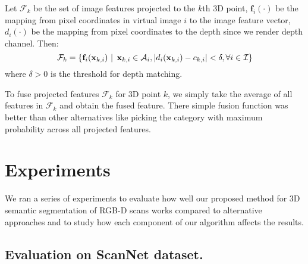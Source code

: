\documentclass[runningheads]{llncs}
\begin{document}
Let $\mathcal{F}_k$ be the set of image features projected to the $k$th 3D point, $\mathbf{f}_i(\cdot)$ be the mapping from pixel coordinates in virtual image $i$ to the image feature vector, $d_i(\cdot)$ be the mapping from pixel coordinates to the depth since we render depth channel. Then:
\begin{equation}
    \mathcal{F}_k = \left\{ \mathbf{f}_i(\mathbf{x}_{k,i}) \ \Large{\vert} \ \mathbf{x}_{k,i} \in \mathcal{A}_i, \left\lvert d_i(\mathbf{x}_{k,i}) - c_{k,i} \right\rvert  < \delta, \forall i\in\mathcal{I} \right\}
\end{equation}
where $\delta>0$ is the threshold for depth matching.

To fuse projected features $\mathcal{F}_k$ for 3D point $k$, we simply take the average of all features in $\mathcal{F}_k$ and obtain the fused feature. There simple fusion function was better than other alternatives like picking the category with maximum probability across all projected features.









 \section{Experiments}\label{sec:exp}

We ran a series of experiments to evaluate how well our proposed method for 3D semantic segmentation of RGB-D scans works compared to alternative approaches and to study how each component of our algorithm affects the results.

\subsection{Evaluation on ScanNet dataset.}
\end{document}
